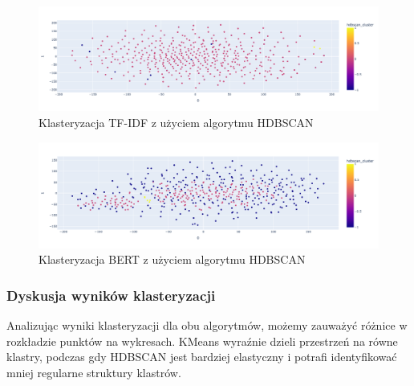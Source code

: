 \documentclass[12pt]{article}
\begin{document}
\begin{figure}[H]
    \centering
    \includegraphics[width=\textwidth]{../../plots/tf-idf-hdbscan-sentence.png}
    \caption{Klasteryzacja TF-IDF z użyciem algorytmu HDBSCAN}
    \label{fig:hdbscan_tf-idf}
\end{figure}

\begin{figure}[H]
    \centering
    \includegraphics[width=\textwidth]{../../plots/bert-hdbscan-sentence.png}
    \caption{Klasteryzacja BERT z użyciem algorytmu HDBSCAN}
    \label{fig:hdbscan_bert}
\end{figure}

\subsubsection{Dyskusja wyników klasteryzacji}

Analizując wyniki klasteryzacji dla obu algorytmów, możemy zauważyć różnice w rozkładzie punktów na wykresach. KMeans wyraźnie dzieli przestrzeń na równe klastry, podczas gdy HDBSCAN jest bardziej elastyczny i potrafi identyfikować mniej regularne struktury klastrów.
\end{document}
